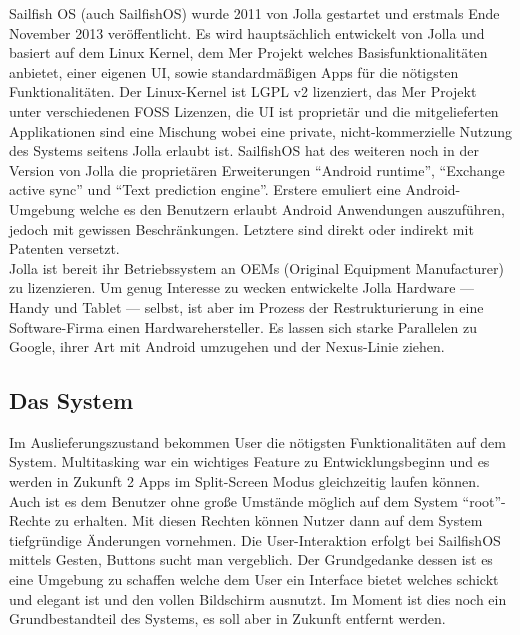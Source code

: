 Sailfish OS (auch \mbox{SailfishOS}) wurde 2011 von Jolla gestartet und erstmals Ende November 2013\cite{online:jolla-about} veröffentlicht. Es wird hauptsächlich entwickelt von Jolla und basiert auf dem Linux Kernel, dem Mer Projekt welches Basisfunktionalitäten anbietet, einer eigenen UI, sowie standardmäßigen Apps für die nötigsten Funktionalitäten\cite{online:sailfish-about}. Der Linux-Kernel ist LGPL v2 lizenziert\cite{online:kernel-license}, das Mer Projekt unter verschiedenen FOSS Lizenzen\cite{online:mer-license}, die UI ist proprietär und die mitgelieferten Applikationen sind eine Mischung\cite{online:sailfish-about} wobei eine private, nicht-kommerzielle Nutzung des Systems seitens Jolla erlaubt ist\cite{online:sailfish-eula}. \mbox{SailfishOS} hat des weiteren noch in der Version von Jolla die proprietären Erweiterungen\cite{online:sailfish-about} ``Android runtime''\cite{online:sailfish-android-runtime-licensor}, ``Exchange active sync''\cite{online:microsoft-eas} und ``Text prediction engine''\cite{online:jolla-xt9}\cite{online:xt9-license}. Erstere emuliert eine Android-Umgebung welche es den Benutzern erlaubt Android Anwendungen auszuführen, jedoch mit gewissen Beschränkungen\cite{online:sailfish-android-runtime}. Letztere sind direkt oder indirekt mit Patenten versetzt.\\
Jolla ist bereit ihr Betriebssystem an OEMs (Original Equipment Manufacturer) zu lizenzieren. Um genug Interesse zu wecken entwickelte Jolla Hardware --- Handy\cite{online:jolla-smartphone} und Tablet\cite{online:jolla-tablet} --- selbst, ist aber im Prozess der Restrukturierung in eine Software-Firma einen Hardwarehersteller\cite{online:jolla-googlelike}. Es lassen sich starke Parallelen zu Google, ihrer Art mit Android umzugehen und der Nexus-Linie ziehen.\\

\subsection{Das System}
Im Auslieferungszustand bekommen User die nötigsten Funktionalitäten auf dem System. Multitasking war ein wichtiges Feature zu Entwicklungsbeginn und es werden in Zukunft 2 Apps im Split-Screen Modus gleichzeitig laufen können\cite{online:sailfish-multitasking}. Auch ist es dem Benutzer ohne große Umstände möglich auf dem System ``root''-Rechte zu erhalten\cite{online:sailfish-root}. Mit diesen Rechten können Nutzer dann auf dem System tiefgründige Änderungen vornehmen. Die User-Interaktion erfolgt bei SailfishOS mittels Gesten, Buttons sucht man vergeblich. Der Grundgedanke dessen ist es eine Umgebung zu schaffen welche dem User ein Interface bietet welches schickt und elegant ist und den vollen Bildschirm ausnutzt\cite{online:sailfish-ui}. Im Moment ist dies noch ein Grundbestandteil des Systems, es soll aber in Zukunft entfernt werden\cite{online:sailfish-about}.
